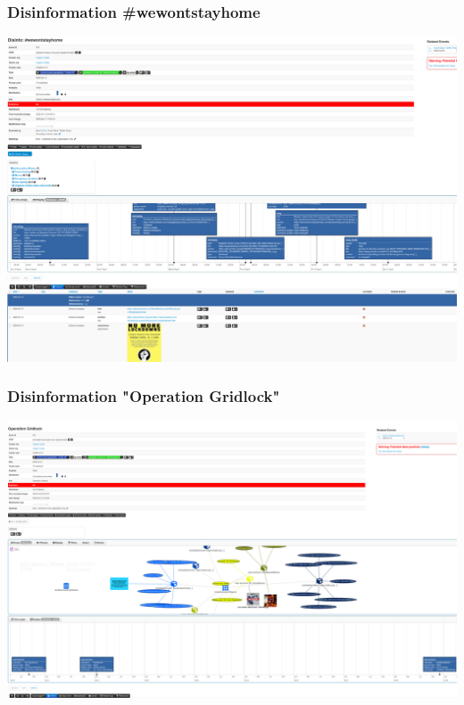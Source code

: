 \begin{frame}
    \frametitle{Disinformation \#wewontstayhome}
    \includegraphics[width=1.00\linewidth]{wewontstayhome.png}
\end{frame}
\begin{frame}
    \frametitle{Disinformation "Operation Gridlock"}
    \includegraphics[width=1.00\linewidth]{operationgridlock.png}
\end{frame}
